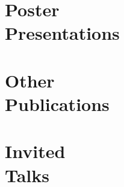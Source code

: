 \documentclass[margin,line]{resume}
\begin{document}
\begin{resume}
    \section{\mysidestyle Poster\\Presentations}
    \begin{bibenum}
        \item {}
        \item {}
    \end{bibenum}
    \section{\mysidestyle Other\\Publications}
    \begin{bibenum}
         \item {}
    \end{bibenum}

    \section{\mysidestyle Invited\\Talks}


\end{resume}
\end{document}
